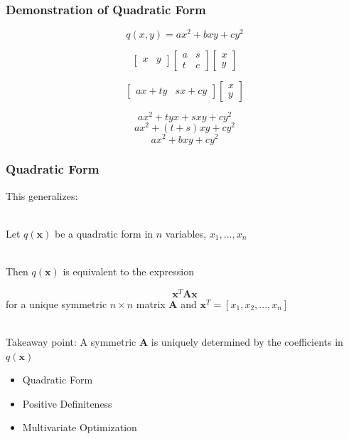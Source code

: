 \documentclass{beamer}
\numberwithin{equation}{section}
\begin{document}
\begin{frame}
\frametitle{Demonstration of Quadratic Form}
$$q(x, y)=ax^2+bxy+cy^2$$ \pause

$$\begin{bmatrix}
x& y
\end{bmatrix} 
\begin{bmatrix}
a & s \\
t& c
\end{bmatrix} 
\begin{bmatrix}
x\\
 y
\end{bmatrix} 
$$\pause

$$\begin{bmatrix}
ax+ty& sx+cy
\end{bmatrix} 
\begin{bmatrix}
x\\
 y
\end{bmatrix} 
$$\pause

$$
ax^2+tyx+ sxy+cy^2
$$\pause
$$
ax^2+(t+s)xy+cy^2
$$\pause
$$
ax^2+bxy+cy^2
$$


\end{frame}




\begin{frame}
\frametitle{Quadratic Form}

This generalizes: \pause

\ \\Let $q(\mathbf{x})$ be a quadratic form in $n$ variables, $x_1, ..., x_n$ \pause

\ \\Then $q(\mathbf{x})$ is equivalent to the expression

$$\mathbf{x}^T\mathbf{A}\mathbf{x}$$ for a unique symmetric $n\times n$ matrix $\mathbf{A}$ and $\mathbf{x}^T=[x_1, x_2, ..., x_n]$ \pause

\ \\Takeaway point: A symmetric $\mathbf{A}$ is uniquely determined by the coefficients in  $q(\mathbf{x})$

\end{frame}



\begin{frame}

\begin{itemize}
\item \textcolor{mygray}{Quadratic Form}
\item \textcolor{myblack}{Positive Definiteness}
\item \textcolor{mygray}{Multivariate Optimization}
\end{itemize}

\end{frame}
\end{document}
